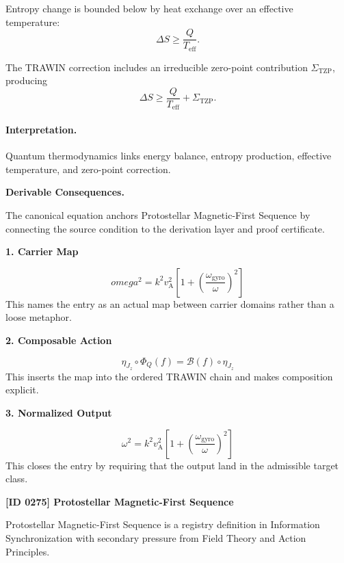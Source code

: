 Entropy change is bounded below by heat exchange over an effective temperature:
\begin{equation}
\Delta S\geq \frac{Q}{T_{\mathrm{eff}}}.
\end{equation}

The TRAWIN correction includes an irreducible zero-point contribution $\Sigma_{\mathrm{TZP}}$, producing
\begin{equation}
\boxed{
\Delta S
\geq
\frac{Q}{T_{\mathrm{eff}}}
+
\Sigma_{\mathrm{TZP}} .
}
\end{equation}

\paragraph{Interpretation.}
Quantum thermodynamics links energy balance, entropy production, effective temperature, and zero-point correction.

\par\vspace{0.35em}
\noindent\textbf{Derivable Consequences.}\quad
\begingroup
\footnotesize
\raggedright
The canonical equation anchors Protostellar Magnetic-First Sequence by connecting the source condition to the derivation layer and proof certificate.
\par\endgroup

\noindent\textbf{1. Carrier Map}\par
\[
omega^{2} = k^{2} v_{\mathrm{A}}^{2}\left[1 + \left(\frac{\omega_{\mathrm{gyro}}}{\omega}\right)^{2}\right]
\]
\noindent This names the entry as an actual map between carrier domains rather than a loose metaphor.\par
\noindent\textbf{2. Composable Action}\par
\[
\eta_{J_z}\circ\Phi_Q(f)=\mathcal{B}(f)\circ\eta_{J_z}
\]
\noindent This inserts the map into the ordered TRAWIN chain and makes composition explicit.\par
\noindent\textbf{3. Normalized Output}\par
\[
\omega^{2} = k^{2} v_{\mathrm{A}}^{2}\left[1 + \left(\frac{\omega_{\mathrm{gyro}}}{\omega}\right)^{2}\right]
\]
\noindent This closes the entry by requiring that the output land in the admissible target class.\par

\clearpage
\noindent\textbf{[ID 0275] Protostellar Magnetic-First Sequence}\par
\vspace{0.35em}
\begingroup\small
{}
Protostellar Magnetic-First Sequence is a registry definition in Information Synchronization with secondary pressure from Field Theory and Action Principles.

